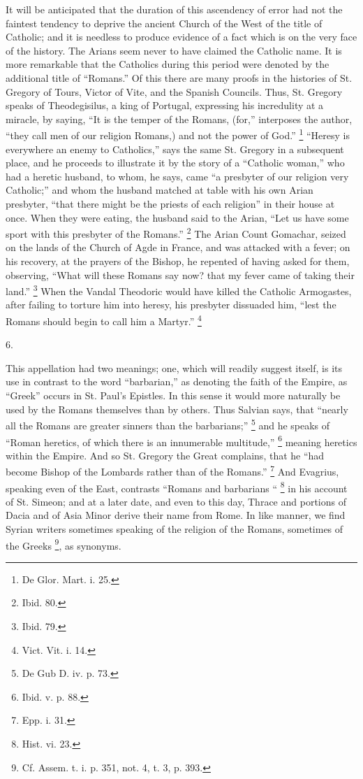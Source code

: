 It will be anticipated that the duration of this ascendency of
error had not the faintest tendency to deprive the ancient Church of
the West of the title of Catholic; and it is needless to produce
evidence of a fact which is on the very face of the history. The
Arians seem never to have claimed the Catholic name. It is more
remarkable that the Catholics during this period were denoted by the
additional title of ``Romans.'' Of this there are many proofs
in the histories of St. Gregory of Tours, Victor of Vite, and the
Spanish Councils. Thus, St. Gregory speaks of Theodegisilus, a king of
Portugal, expressing his incredulity at a miracle, by saying, ``It is the temper of the Romans, (for,'' interposes the author,
``they call men of our religion Romans,) and not the power of
God.'' \footnote{De Glor. Mart. i. 25.}
``Heresy is everywhere an enemy to Catholics,'' says the same
St. Gregory in a subsequent place, and he proceeds to illustrate it by
the story of a ``Catholic woman,'' who had a heretic husband,
to whom, he says, came ``a presbyter of our religion very
Catholic;'' and whom the husband matched at table with his own
Arian presbyter, ``that there might be the priests of each
religion'' in their house at once. When they were eating, the
husband said to the Arian, ``Let us have some sport with this
presbyter of the Romans.'' \footnote{Ibid. 80.} The Arian Count Gomachar, seized on the lands of the Church
of Agde in France, and was attacked with a fever; on his recovery, at
the prayers of the Bishop, he repented of having asked for them,
observing, ``What will these Romans say now? that my fever came of
taking their land.'' \footnote{Ibid. 79.}
When the Vandal Theodoric would have killed the Catholic Armogastes,
after failing to torture him into heresy, his presbyter dissuaded him,
``lest the Romans should begin to call him a Martyr.'' \footnote{Vict. Vit. i. 14.}

6.

This appellation had two meanings; one, which will readily suggest
itself, is its use in contrast to the word ``barbarian,'' as
denoting the faith of the Empire, as ``Greek'' occurs in St.
Paul's Epistles. In this sense it would more naturally be used by the
Romans themselves than by others. Thus Salvian says, that ``nearly
all the Romans are greater sinners than the barbarians;'' \footnote{De Gub D. iv. p. 73.} and he speaks of ``Roman heretics, of which there is an
innumerable multitude,'' \footnote{Ibid. v. p. 88.} meaning heretics within the Empire. And so St. Gregory the
Great complains, that he ``had become Bishop of the Lombards
rather than of the Romans.'' \footnote{Epp. i. 31.} And Evagrius, speaking even of the East, contrasts
``Romans and barbarians `` \footnote{Hist. vi. 23.} in his account of St. Simeon; and at a later date, and even
to this day, Thrace and portions of Dacia and of Asia Minor derive
their name from Rome. In like manner, we find Syrian writers sometimes
speaking of the religion of the Romans, sometimes of the Greeks \footnote{Cf. Assem. t. i. p. 351, not. 4, t. 3, p.
393.}, as synonyms.

